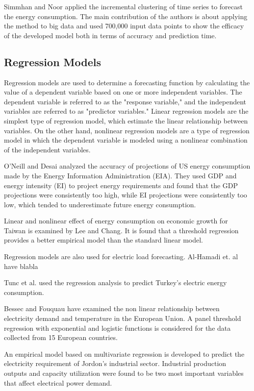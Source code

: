 \documentclass[lettersize,journal]{IEEEtran}
\begin{document}
Simmhan and Noor\cite{time series clustering} applied the incremental clustering of time series to forecast the energy consumption. The main contribution of the authors is about applying the method to big data and used 700,000 input data points to show the efficacy of the developed model both in terms of accuracy and prediction time. 




  \subsection{Regression Models}
  Regression models are used to determine a forecasting function by calculating the value of a dependent variable based on one or more independent variables. The dependent variable is referred to as the "response variable," and the independent variables are referred to as "predictor variables." Linear regression models are the simplest type of regression model, which estimate the linear relationship between variables. On the other hand, nonlinear regression models are a type of regression model in which the dependent variable is modeled using a nonlinear combination of the independent variables.

  O'Neill and Desai analyzed the accuracy of projections of US energy consumption made by the Energy Information Administration (EIA)\cite{O'Neill BC}. They used GDP and energy intensity (EI) to project energy requirements and found that the GDP projections were consistently too high, while EI projections were consistently too low, which tended to underestimate future energy consumption.
  
  
  Linear and nonlinear effect of energy consumption on economic growth for Taiwan is examined by Lee and Chang\cite{Lee CC}. It is found that a threshold regression provides a better empirical model than the standard linear model.

  
  Regression models are also used for electric load forecasting. Al-Hamadi et. al\cite{Al-Hamadi HM} have blabla

  
  Tunc et al.\cite{Tunc} used the regression analysis to predict Turkey's electric energy consumption.

  
  Bessec and Fouquau\cite{Bessec} have examined the non linear relationship between electricity demand and temperature in the European Union. A panel threshold regression with exponential and logistic functions is considered for the data collected from 15 European countries. 
  

  An empirical model based on multivariate regression is developed\cite{Al-Ghandoor A} to predict the electricity requirement of Jordon's industrial sector. Industrial production outputs and capacity utilization were found to be two most important variables that affect electrical power demand. 
\end{document}

